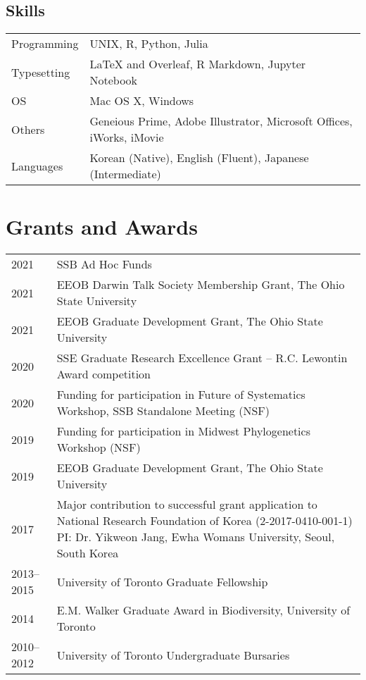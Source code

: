 \documentclass[11pt]{article}
\begin{document}
\subsection*{Skills}
\begin{longtable}{p{}  p{}}
Programming & UNIX, R, Python, Julia\\
Typesetting &  {\LaTeX} and Overleaf, R Markdown, Jupyter Notebook\\
OS & Mac OS X, Windows\\
Others & Geneious Prime, Adobe Illustrator, Microsoft Offices, iWorks, iMovie\\
Languages & Korean (Native), English (Fluent), Japanese (Intermediate)\vspace{5pt}\\
\end{longtable}



\hspace{0pt}

\pagebreak

\section*{Grants and Awards}

\begin{longtable}{p{}  p{}}%
2021 &	SSB Ad Hoc Funds\\
2021 &	EEOB Darwin Talk Society Membership Grant, The Ohio State University\\
2021 &	EEOB Graduate Development Grant, The Ohio State University\\
2020 &	SSE Graduate Research Excellence Grant – R.C. Lewontin Award competition\\%
2020 &	Funding for participation in Future of Systematics Workshop, SSB Standalone Meeting (NSF)\\
2019 &	Funding for participation in Midwest Phylogenetics Workshop (NSF)\\
2019 &	EEOB Graduate Development Grant, The Ohio State University\\
2017 &	Major contribution to successful grant application to 	National Research Foundation of Korea (2-2017-0410-001-1) PI: Dr. Yikweon Jang, Ewha Womans University, Seoul, South Korea \\%
2013--2015 & University of Toronto Graduate Fellowship\\
2014 &	E.M. Walker Graduate Award in Biodiversity, University of Toronto\\%
2010--2012 &	University of Toronto Undergraduate Bursaries\\%

\end{longtable}
\end{document}
